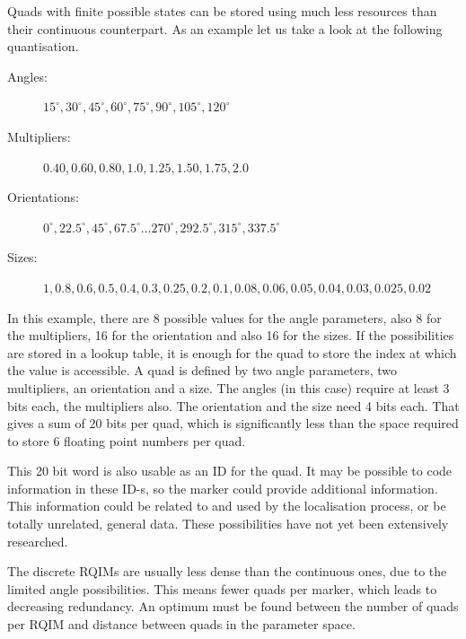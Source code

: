 Quads with finite possible states can be stored using much less resources than their continuous counterpart.
As an example let us take a look at the following quantisation.
\begin{description}
	\item[Angles:] $15^\circ,30^\circ,45^\circ,60^\circ,75^\circ,90^\circ,105^\circ,120^\circ$
	\item[Multipliers:] $0.40, 0.60, 0.80, 1.0, 1.25, 1.50, 1.75, 2.0$
	\item[Orientations:] $0^\circ, 22.5^\circ, 45^\circ, 67.5^\circ \dots 270^\circ, 292.5^\circ, 315^\circ, 337.5^\circ$
	\item[Sizes:] $1, 0.8, 0.6, 0.5, 0.4, 0.3, 0.25, 0.2, 0.1, 0.08, 0.06, 0.05, 0.04, 0.03, 0.025, 0.02$
\end{description}
In this example, there are 8 possible values for the angle parameters, also 8 for the multipliers, 16 for the orientation and also 16 for the sizes.
If the possibilities are stored in a lookup table, it is enough for the quad to store the index at which the value is accessible.
A quad is defined by two angle parameters, two multipliers, an orientation and a size.
The angles (in this case) require at least 3 bits each, the multipliers also.
The orientation and the size need 4 bits each.
That gives a sum of 20 bits per quad, which is significantly less than the space required to store 6 floating point numbers per quad.

This 20 bit word is also usable as an ID for the quad.
It may be possible to code information in these ID-s, so the marker could provide additional information.
This information could be related to and used by the localisation process, or be totally unrelated, general data.
These possibilities have not yet been extensively researched.

The discrete RQIMs are usually less dense than the continuous ones, due to the limited angle possibilities.
This means fewer quads per marker, which leads to decreasing redundancy.
An optimum must be found between the number of quads per RQIM and distance between quads in the parameter space.